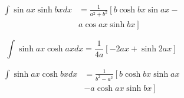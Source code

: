 \documentclass[11pt,twoside]{article}
\begin{document}
\begin{multicols}{3}
\begin{footnotesize}
\begin{align}
\int \sin ax \sinh bx dx &=
\frac{1}{a^2 + b^2} \left[
b \cosh bx \sin ax -
\right . \nonumber \\ & \left .
 a \cos ax \sinh bx
\right]
\end{align}

\begin{equation}
\int \sinh ax \cosh ax dx=
\frac{1}{4a}\left[
-2ax + \sinh 2ax \right]
\end{equation}

\begin{align}
\int \sinh ax \cosh bx dx&=
\frac{1}{b^2-a^2}\left[
b \cosh bx \sinh ax
\right . \nonumber \\ & \left .
- a \cosh ax \sinh bx \right]
\end{align}


\end{footnotesize}
\end{multicols}
\end{document}
